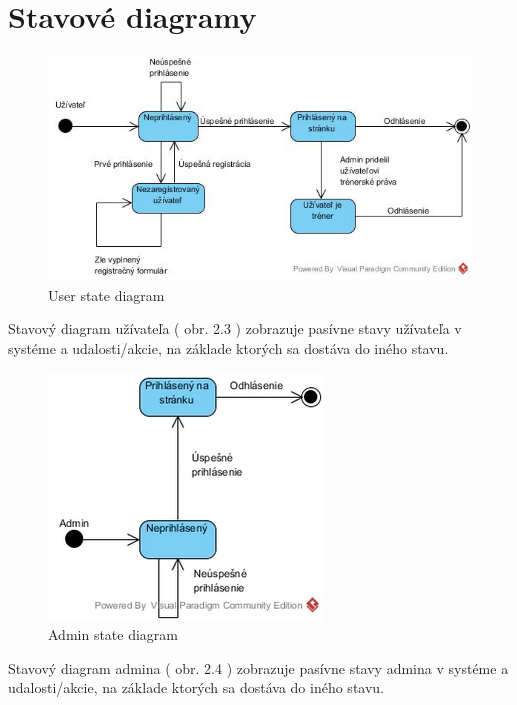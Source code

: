 \documentclass[12pt,a4paper]{report}
\theoremstyle{definition}
\theoremstyle{remark}
\begin{document}
\section{Stavové diagramy}
\begin{figure}[!htb]
\centering
\includegraphics[width=\textwidth]{State diagram - user.jpg}
\caption{User state diagram}
\end{figure}

Stavový diagram užívateľa ( obr. 2.3 ) zobrazuje pasívne stavy užívateľa v systéme a udalosti/akcie, na základe ktorých sa dostáva do iného stavu.

\begin{figure}[!htb]
\centering
\includegraphics{State diagram - admin.jpg}
\caption{Admin state diagram}
\end{figure}

Stavový diagram admina ( obr. 2.4 ) zobrazuje pasívne stavy admina v systéme a udalosti/akcie, na základe ktorých sa dostáva do iného stavu.


\newpage
\end{document}
